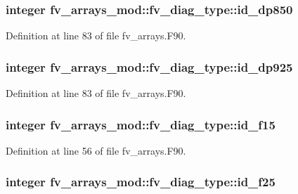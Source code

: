 \subsubsection[{id\-\_\-dp850}]{\setlength{\rightskip}{0pt plus 5cm}integer fv\-\_\-arrays\-\_\-mod\-::fv\-\_\-diag\-\_\-type\-::id\-\_\-dp850}\label{structfv__arrays__mod_1_1fv__diag__type_a79dafa4d20c4ef1c80103be176f354f6}


Definition at line 83 of file fv\-\_\-arrays.\-F90.

\subsubsection[{id\-\_\-dp925}]{\setlength{\rightskip}{0pt plus 5cm}integer fv\-\_\-arrays\-\_\-mod\-::fv\-\_\-diag\-\_\-type\-::id\-\_\-dp925}\label{structfv__arrays__mod_1_1fv__diag__type_a50f5149ebe1b402c2a47450c9099385b}


Definition at line 83 of file fv\-\_\-arrays.\-F90.

\subsubsection[{id\-\_\-f15}]{\setlength{\rightskip}{0pt plus 5cm}integer fv\-\_\-arrays\-\_\-mod\-::fv\-\_\-diag\-\_\-type\-::id\-\_\-f15}\label{structfv__arrays__mod_1_1fv__diag__type_aec34ce54000b540efbb1d2b45f412199}


Definition at line 56 of file fv\-\_\-arrays.\-F90.

\subsubsection[{id\-\_\-f25}]{\setlength{\rightskip}{0pt plus 5cm}integer fv\-\_\-arrays\-\_\-mod\-::fv\-\_\-diag\-\_\-type\-::id\-\_\-f25}\label{structfv__arrays__mod_1_1fv__diag__type_a29886f5f34d40b7c4b4116ab943ccb6b}


